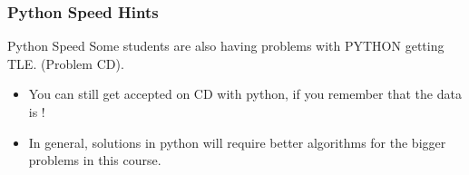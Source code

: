 \begin{frame}
  \frametitle{Python Speed Hints}
  \begin{block}{Python Speed}
    Some students are also having problems with PYTHON getting
    TLE. (Problem CD).
  \end{block}

  \bigskip
  
  \begin{itemize}
  \item You can still get accepted on CD with python, if you
    remember that the data is !

    \bigskip
    
  \item In general, solutions in python will require better algorithms
    for the bigger problems in this course.
  \end{itemize}
\end{frame}

